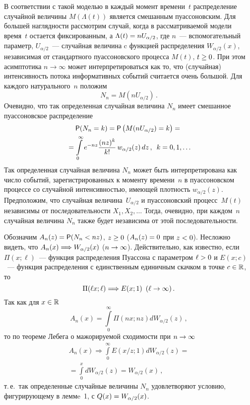 \begin{multicols}{2}
В соответствии с такой моделью в каждый момент времени~$t$
распределение случайной величины $M(\Lambda(t))$ является смешанным
пуассоновским. Для большей наглядности рассмотрим случай, когда в
рассматриваемой модели время~$t$ остается фиксированным, а
$\Lambda(t)\hm=nU_{\alpha/2}$, где $n$~--- вспомогательный параметр,
$U_{\alpha/2}$~--- случайная величина c функцией распределения
$W_{\alpha/2}(x)$, независимая от стандартного пуассоновского
процесса $M(t)$, $t\hm\ge0$. При этом асимптотика $n\to\infty$ может
интерпретироваться как то, что (случайная) интенсивность потока
информативных событий считается очень большой. Для каждого
натурального~$n$ положим
$$
N_n=M(nU_{\alpha/2})\,.
$$
Очевидно, что так определенная случайная величина $N_n$ имеет
смешанное пуассоновское распределение
\begin{multline*}
{\sf P}(N_n=k)={\sf P}\left(M(nU_{\alpha/2})=k\right)={}\\
{}=\int\limits_0^{\infty}e^{-nz}\displaystyle\frac{\displaystyle (nz)^k\mathstrut}{\displaystyle k!\mathstrut}\,w_{\alpha/2}(z)\,dz\,,\enskip
 k=0,1,\ldots
\end{multline*}
Так определенная случайная величина $N_n$ может быть
интерпретирована как число событий, зарегистрированных к моменту
времени~$n$ в пуас\-со\-нов\-ском процессе со случайной интенсив\-ностью,
имеющей плотность $w_{\alpha/2}(z)$. Предположим, что случайная
величина~$U_{\alpha/2}$ и пуассоновский процесс~$M(t)$ независимы от
последовательности $X_1,X_2,\ldots$ Тогда, очевидно, при каждом~$n$
случайная величина $N_n$ также будет независима от этой
последовательности.

Обозначим $A_n(z)\hm={\sf P}(N_n\hm<nz)$, $z\hm\ge0$ ($A_n(z)\hm=0$ при $z\hm<0$).
Несложно видеть, что $A_n(x)\hm\Longrightarrow W_{\alpha/2}(x)$
($n\hm\to\infty$). Действительно, как известно, если $\Pi(x;\ell)$~---
функция распределения \mbox{Пуассона} с параметром $\ell\hm>0$ и $E(x;c)$~---
функция распределения с единственным единичным скачком в точке
$c\hm\in\r$, то
$$
\Pi(\ell x;\ell)\Longrightarrow E(x;1)\enskip (\ell\to\infty)\,.
$$
Так как для $x\in\mathbb{R}$
$$
A_n(x)=\int\limits_{0}^{\infty}\Pi\left(n x; n z\right)dW_{\alpha/2}(z)\,,
$$
то по теореме Лебега о мажорируемой сходимости при $n\hm\to\infty$
\begin{multline*}
A_n(x)\Longrightarrow\int\limits_{0}^{\infty}E\left(x/z;1\right)dW_{\alpha/2}(z)={}\\
{}=
\int\limits_{0}^{x}dW_{\alpha/2}(z)=W_{\alpha/2}(x)\,,
\end{multline*}
т.\,е.\ так определенные случайные величины $N_n$ удовле\-тво\-ря\-ют
условию, фигурирующему в леммe~1, с $Q(x)\hm=W_{\alpha/2}(x)$.


\end{multicols}
